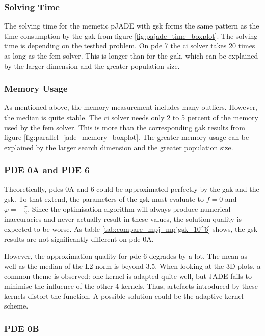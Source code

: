 \documentclass[./\jobname.tex]{subfiles}
\begin{document}
\subsubsection{Solving Time}
The solving time for the memetic pJADE with \gls{gsk} forms the same pattern as the time consumption by the \gls{gak} from figure \ref{fig:pajade_time_boxplot}. The solving time is depending on the testbed problem. On \gls{pde} 7 the \gls{ci} solver takes 20 times as long as the \gls{fem} solver. This is longer than for the \gls{gak}, which can be explained by the larger dimension and the greater population size.  

\subsubsection{Memory Usage}

As mentioned above, the memory measurement includes many outliers. However, the median is quite stable. The \gls{ci} solver needs only 2 to 5 percent of the memory used by the \gls{fem} solver. This is more than the corresponding \gls{gak} results from figure \ref{fig:parallel_jade_memory_boxplot}. The greater memory usage can be explained by the larger search dimension and the greater population size. 

\subsubsection{PDE 0A and PDE 6}

Theoretically, \gls{pde}s 0A and 6 could be approximated perfectly by the \gls{gak} and the \gls{gsk}. To that extend, the parameters of the \gls{gsk} must evaluate to $f=0$ and $\varphi=-\frac{\pi}{2}$. Since the optimisation algorithm will always produce numerical inaccuracies and never actually result in these values, the solution quality is expected to be worse. As table \ref{tab:compare_mpj_mpjgsk_10^6} shows, the \gls{gsk} results are not significantly different on \gls{pde} 0A. 

However, the approximation quality for \gls{pde} 6 degrades by a lot. The mean as well as the median of the L2 norm is beyond 3.5. When looking at the 3D plots, a common theme is observed: one kernel is adapted quite well, but JADE fails to minimise the influence of the other 4 kernels. Thus, artefacts introduced by these kernels distort the function. A possible solution could be the adaptive kernel scheme. 


\subsubsection{PDE 0B}
\end{document}
